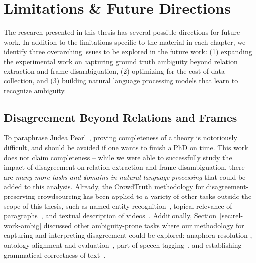 \section{Limitations \& Future Directions}

The research presented in this thesis has several possible directions for future work. In addition to the limitations specific to the material in each chapter, we identify three overarching issues to be explored in the future work: (1) expanding the experimental work on capturing ground truth ambiguity beyond relation extraction and frame disambiguation, (2) optimizing for the cost of data collection, and (3) building natural language processing models that learn to recognize ambiguity.


\subsection{Disagreement Beyond Relations and Frames}


To paraphrase Judea Pearl~\cite{pearl2018book}, proving completeness of a theory is notoriously difficult, and should be avoided if one wants to finish a PhD on time. This work does not claim completeness -- while we were able to successfully study the impact of disagreement on relation extraction and frame disambiguation, there are \textit{many more tasks and domains in natural language processing} that could be added to this analysis. Already, the CrowdTruth methodology for disagreement-preserving crowdsourcing has been applied to a variety of other tasks outside the scope of this thesis, such as named entity recognition~\cite{inel2017harnessing}, topical relevance of paragraphs~\cite{inel2018studying}, and textual description of videos~\cite{inel2018study}. Additionally, Section~\ref{sec:rel-work-ambig} discussed other ambiguity-prone tasks where our methodology for capturing and interpreting disagreement could be explored: anaphora resolution \cite{poesio2005reliability}, ontology alignment and evaluation~\cite{cheatham2014conference}, part-of-speech tagging~\cite{plank-hovy-sogaard:2014:P14-2}, and establishing grammatical correctness of text~\cite{lau2014measuring}.

